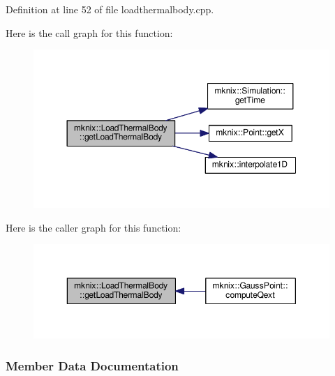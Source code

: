 Definition at line 52 of file loadthermalbody.\+cpp.



Here is the call graph for this function\+:\nopagebreak
\begin{figure}[H]
\begin{center}
\leavevmode
\includegraphics[width=350pt]{d2/d5c/classmknix_1_1_load_thermal_body_a174097626bef1d662a7ee0c24cb62ac1_cgraph}
\end{center}
\end{figure}




Here is the caller graph for this function\+:\nopagebreak
\begin{figure}[H]
\begin{center}
\leavevmode
\includegraphics[width=350pt]{d2/d5c/classmknix_1_1_load_thermal_body_a174097626bef1d662a7ee0c24cb62ac1_icgraph}
\end{center}
\end{figure}




\subsubsection{Member Data Documentation}
\hypertarget{classmknix_1_1_load_thermal_body_adb98192e4cdce5830b451f8272a6e20f}{}
